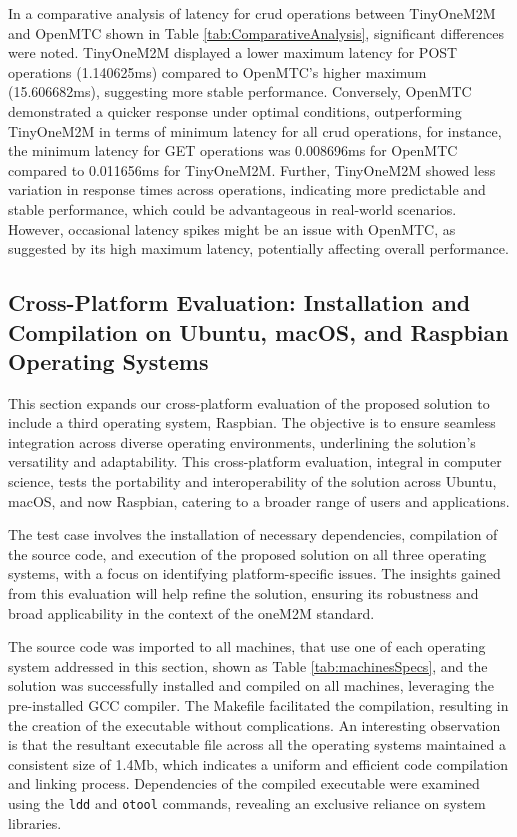 \documentclass[a4paper,fleqn]{cas-dc}
\begin{document}
In a comparative analysis of latency for \gls{crud} operations between TinyOneM2M and OpenMTC shown in Table \ref{tab:ComparativeAnalysis}, significant differences were noted. TinyOneM2M displayed a lower maximum latency for POST operations (1.140625ms) compared to OpenMTC's higher maximum (15.606682ms), suggesting more stable performance. Conversely, OpenMTC demonstrated a quicker response under optimal conditions, outperforming TinyOneM2M in terms of minimum latency for all \gls{crud} operations, for instance, the minimum latency for GET operations was 0.008696ms for OpenMTC compared to 0.011656ms for TinyOneM2M. Further, TinyOneM2M showed less variation in response times across operations, indicating more predictable and stable performance, which could be advantageous in real-world scenarios. However, occasional latency spikes might be an issue with OpenMTC, as suggested by its high maximum latency, potentially affecting overall performance.

\subsection{Cross-Platform Evaluation: Installation and Compilation on Ubuntu, macOS, and Raspbian Operating Systems}

This section expands our cross-platform evaluation of the proposed solution to include a third operating system, Raspbian. The objective is to ensure seamless integration across diverse operating environments, underlining the solution's versatility and adaptability. This cross-platform evaluation, integral in computer science, tests the portability and interoperability of the solution across Ubuntu, macOS, and now Raspbian, catering to a broader range of users and applications.

The test case involves the installation of necessary dependencies, compilation of the source code, and execution of the proposed solution on all three operating systems, with a focus on identifying platform-specific issues. The insights gained from this evaluation will help refine the solution, ensuring its robustness and broad applicability in the context of the oneM2M standard.

The source code was imported to all machines, that use one of each operating system addressed in this section, shown as Table \ref{tab:machinesSpecs}, and the solution was successfully installed and compiled on all machines, leveraging the pre-installed GCC compiler. The Makefile facilitated the compilation, resulting in the creation of the executable without complications. An interesting observation is that the resultant executable file across all the operating systems maintained a consistent size of 1.4Mb, which indicates a uniform and efficient code compilation and linking process. Dependencies of the compiled executable were examined using the \texttt{ldd} and \texttt{otool} commands, revealing an exclusive reliance on system libraries.
\end{document}

